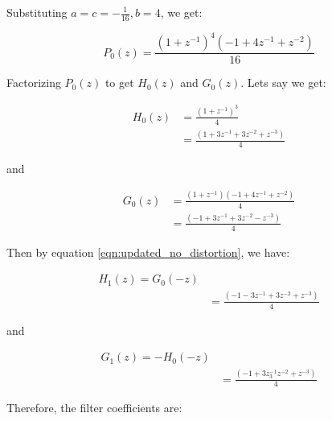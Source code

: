 Substituting $a = c = - \frac{1}{16}, b= 4$, we get:

\begin{equation} 
{P_0(z) = \frac{(1 + z^{-1})^4(-1 + 4z^{-1} + z^{-2})}{16}}
\end{equation}

Factorizing $P_0(z)$ to get $H_0(z)$ and $G_0(z)$. Lets say we get:

\begin{equation} \label{eq1}
\begin{split}
H_0(z) & = \frac{(1 + z^{-1})^3}{4} \\
& = \frac{(1 + 3z^{-1} + 3z^{-2} + z^{-3})}{4}
\end{split}
\end{equation}


and


\begin{equation} \label{eq1}
\begin{split}
G_0(z) & = \frac{(1 + z^{-1})(-1 + 4z^{-1} + z^{-2})}{4} \\
& = \frac{(-1 + 3z^{-1} + 3z^{-2} - z^{-3})}{4}
\end{split}
\end{equation}


Then by equation \ref{eqn:updated_no_distortion}, we have:


\begin{equation} \label{eq1}
\begin{split}
H_1(z) = G_0(-z) \\
& = \frac{(-1 - 3z^{-1} + 3z^{-2} + z^{-3})}{4}
\end{split}
\end{equation}

and

\begin{equation} \label{eq1}
\begin{split}
G_1(z) = -H_0(-z) \\
& = \frac{(-1 + 3z^{-1} _ 3z^{-2} + z^{-3})}{4}
\end{split}
\end{equation}

Therefore, the filter coefficients are:

